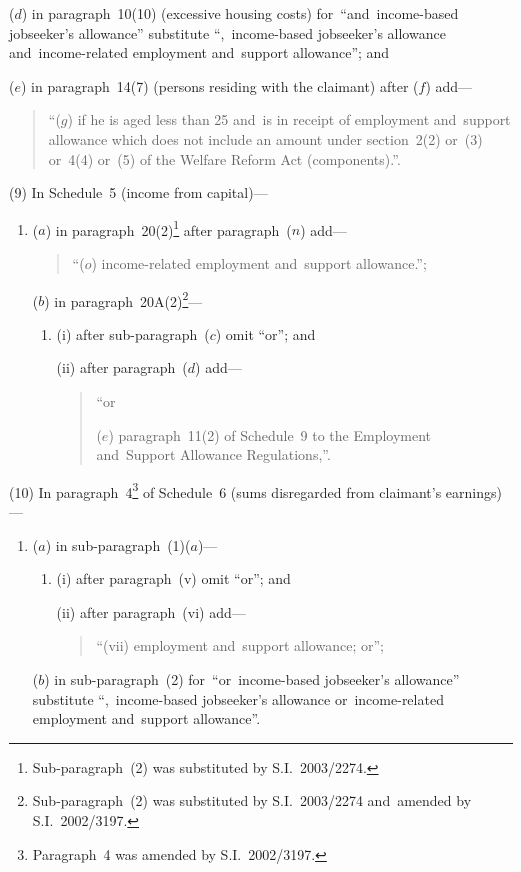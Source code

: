 \documentclass[12pt,a4paper]{article}
\begin{document}
\begin{enumerate}
($d$) in paragraph~10(10) (excessive housing costs) for~“and~income-based jobseeker’s allowance” substitute “,~income-based jobseeker’s allowance and~income-related employment and~support allowance”; and

($e$) in paragraph~14(7) (persons residing with the claimant) after ($f$)  add—
\begin{quotation}
“($g$) if he is aged less than 25 and~is in receipt of employment and~support allowance which does not include an amount under section~2(2) or~(3) or~4(4) or~(5) of the Welfare Reform Act (components).”.
\end{quotation}
\end{enumerate}

(9) In Schedule~5 (income from capital)—
\begin{enumerate}\item[]
($a$) in paragraph~20(2)\footnote{Sub-paragraph~(2) was substituted by S.I.~2003/2274.} after paragraph~($n$)  add—
\begin{quotation}
“($o$) income-related employment and~support allowance.”;
\end{quotation}

($b$) in paragraph~20A(2)\footnote{Sub-paragraph~(2) was substituted by S.I.~2003/2274 and~amended by S.I.~2002/3197.}—
\begin{enumerate}\item[]
(i) after sub-paragraph~($c$)  omit “or”; and

(ii) after paragraph~($d$)  add—
\begin{quotation}
“or

($e$) paragraph~11(2) of Schedule~9 to the Employment and~Support Allowance Regulations,”.
\end{quotation}
\end{enumerate}
\end{enumerate}

(10) In paragraph~4\footnote{Paragraph~4 was amended by S.I.~2002/3197.} of Schedule~6 (sums disregarded from claimant’s earnings)—
\begin{enumerate}\item[]
($a$) in sub-paragraph~(1)($a$)—
\begin{enumerate}\item[]
(i) after paragraph~(v)  omit “or”; and

(ii) after paragraph~(vi)  add—
\begin{quotation}
“(vii) employment and~support allowance; or”;
\end{quotation}
\end{enumerate}

($b$) in sub-paragraph~(2) for~“or~income-based jobseeker’s allowance” substitute “,~income-based jobseeker’s allowance or~income-related employment and~support allowance”.
\end{enumerate}
\end{document}
